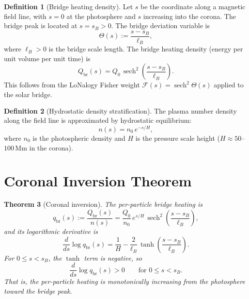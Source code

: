 \documentclass[12pt]{article}
\theoremstyle{plain}
\newtheorem{theorem}{Theorem}[section]
\theoremstyle{definition}
\newtheorem{definition}[theorem]{Definition}
\numberwithin{equation}{section}
\newcommand{\br}{\mathrm{br}}
\DeclareMathOperator{\sech}{sech}
\begin{document}
\begin{definition}[Bridge heating density]\label{def:heatingprofile}
Let $s$ be the coordinate along a magnetic field line, with $s=0$
at the photosphere and $s$ increasing into the corona.  The bridge
peak is located at $s=s_B>0$.  The bridge deviation variable is
\begin{equation}
\Theta(s) := \frac{s-s_B}{\ell_B},
\end{equation}
where $\ell_B>0$ is the bridge scale length.  The bridge heating
density (energy per unit volume per unit time) is
\begin{equation}\label{eq:Qbr}
\boxed{Q_{\br}(s) = Q_0\,\sech^2\!\left(\frac{s-s_B}{\ell_B}\right).}
\end{equation}
This follows from the LoNalogy Fisher weight
$\mathcal{F}(s)=\sech^2\Theta(s)$ applied to the solar bridge.
\end{definition}

\begin{definition}[Hydrostatic density stratification]\label{def:density}
The plasma number density along the field line is approximated by
hydrostatic equilibrium:
\begin{equation}\label{eq:density}
n(s) = n_0\,e^{-s/H},
\end{equation}
where $n_0$ is the photospheric density and $H$ is the pressure
scale height ($H\approx 50$--$100\,\mathrm{Mm}$ in the corona).
\end{definition}


\section{Coronal Inversion Theorem}\label{sec:inversion}

\begin{theorem}[Coronal inversion]\label{thm:inversion}
The per-particle bridge heating is
\begin{equation}\label{eq:perparticle}
q_{\br}(s) := \frac{Q_{\br}(s)}{n(s)}
= \frac{Q_0}{n_0}\,e^{s/H}\,
\sech^2\!\left(\frac{s-s_B}{\ell_B}\right),
\end{equation}
and its logarithmic derivative is
\begin{equation}\label{eq:logderiv}
\frac{d}{ds}\log q_{\br}(s)
= \frac{1}{H}
- \frac{2}{\ell_B}\,\tanh\!\left(\frac{s-s_B}{\ell_B}\right).
\end{equation}
For $0\leq s<s_B$, the $\tanh$ term is negative, so
\begin{equation}\label{eq:monotone}
\boxed{\frac{d}{ds}\log q_{\br}(s) > 0
\qquad\text{for }0\leq s<s_B.}
\end{equation}
That is, the per-particle heating is monotonically increasing
from the photosphere toward the bridge peak.
\end{theorem}
\end{document}
